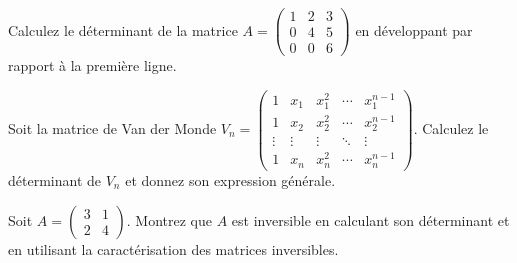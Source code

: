 \begin{exercice}
Calculez le déterminant de la matrice \( A = \begin{pmatrix} 1 & 2 & 3 \\ 0 & 4 & 5 \\ 0 & 0 & 6 \end{pmatrix} \) en développant par rapport à la première ligne.
\end{exercice}

\begin{exercice}
Soit la matrice de Van der Monde \( V_n = \begin{pmatrix} 1 & x_1 & x_1^2 & \cdots & x_1^{n-1} \\ 1 & x_2 & x_2^2 & \cdots & x_2^{n-1} \\ \vdots & \vdots & \vdots & \ddots & \vdots \\ 1 & x_n & x_n^2 & \cdots & x_n^{n-1} \end{pmatrix} \). Calculez le déterminant de \( V_n \) et donnez son expression générale.
\end{exercice}

\begin{exercice}
Soit \( A = \begin{pmatrix} 3 & 1 \\ 2 & 4 \end{pmatrix} \). Montrez que \( A \) est inversible en calculant son déterminant et en utilisant la caractérisation des matrices inversibles.
\end{exercice}

